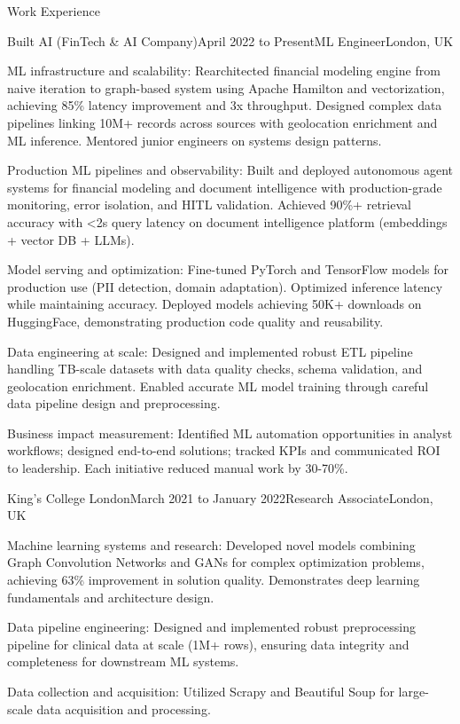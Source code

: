 \documentclass{resume} %
\begin{document}
\begin{rSection}{Work Experience}
\begin{rSubsection}{Built AI (FinTech \& AI Company)}{April 2022 to Present}{ML Engineer}{London, UK}
\item ML infrastructure and scalability: Rearchitected financial modeling engine from naive iteration to graph-based system using Apache Hamilton and vectorization, achieving 85\% latency improvement and 3x throughput. Designed complex data pipelines linking 10M+ records across sources with geolocation enrichment and ML inference. Mentored junior engineers on systems design patterns.
\item Production ML pipelines and observability: Built and deployed autonomous agent systems for financial modeling and document intelligence with production-grade monitoring, error isolation, and HITL validation. Achieved 90\%+ retrieval accuracy with <2s query latency on document intelligence platform (embeddings + vector DB + LLMs).
\item Model serving and optimization: Fine-tuned PyTorch and TensorFlow models for production use (PII detection, domain adaptation). Optimized inference latency while maintaining accuracy. Deployed models achieving 50K+ downloads on HuggingFace, demonstrating production code quality and reusability.
\item Data engineering at scale: Designed and implemented robust ETL pipeline handling TB-scale datasets with data quality checks, schema validation, and geolocation enrichment. Enabled accurate ML model training through careful data pipeline design and preprocessing.
\item Business impact measurement: Identified ML automation opportunities in analyst workflows; designed end-to-end solutions; tracked KPIs and communicated ROI to leadership. Each initiative reduced manual work by 30-70\%.
\end{rSubsection}


\begin{rSubsection}{King's College London}{March 2021 to January 2022}{Research Associate}{London, UK}
\item Machine learning systems and research: Developed novel models combining Graph Convolution Networks and GANs for complex optimization problems, achieving 63\% improvement in solution quality. Demonstrates deep learning fundamentals and architecture design.
\item Data pipeline engineering: Designed and implemented robust preprocessing pipeline for clinical data at scale (1M+ rows), ensuring data integrity and completeness for downstream ML systems.
\item Data collection and acquisition: Utilized Scrapy and Beautiful Soup for large-scale data acquisition and processing.

\end{rSubsection}

\end{rSection}
\end{document}
